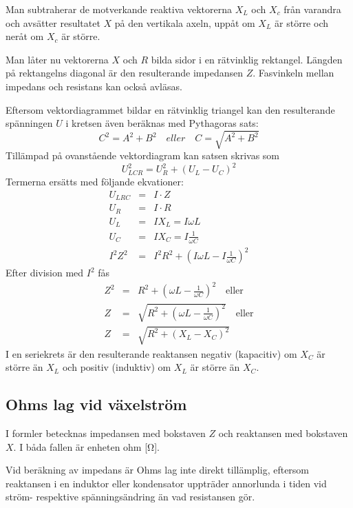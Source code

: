 Man subtraherar de motverkande reaktiva vektorerna \(X_L\) och \(X_c\) från
varandra och avsätter resultatet \(X\) på den vertikala axeln, uppåt om \(X_L\)
är större och neråt om \(X_c\) är större.

Man låter nu vektorerna \(X\) och \(R\) bilda sidor i en rätvinklig rektangel.
Längden på rektangelns diagonal är den resulterande impedansen \(Z\).
Fasvinkeln mellan impedans och resistans kan också avläsas.

Eftersom vektordiagrammet bildar en rätvinklig triangel kan den resulterande
spänningen \(U\) i kretsen även beräknas med Pythagoras sats:
%
\[C^2 = A^2 + B^2 \quad eller \quad C = \sqrt{A^2 + B^2}\]
%
Tillämpad på ovanstående vektordiagram kan satsen skrivas som
%
\[U_{LCR}^2 = U_R^2 + ( U_L - U_C)^2\]
%
Termerna ersätts med följande ekvationer:
\[
\begin{array}{rcl}
  U_{LRC} &=& I \cdot Z \\[1ex]
  U_R     &=& I \cdot R \\[1ex]
  U_L     &=& I X_L = I \omega L \\[1ex]
  U_C     &=& I X_C = I \frac{1}{\omega C} \\[1ex]
  I^2 Z^2 &=& I^2 R^2 + ( I \omega L - I\frac{1}{\omega C})^2
\end{array}
\]
%
Efter division med \(I^2\) fås
%
\[
\begin{array}{rcl}
  Z^2 &=& R^2 + ( \omega L - \frac{1}{\omega C} )^2 \quad \text{eller} \\[1ex]
  Z   &=& \sqrt{R^2 + (\omega L - \frac{1}{\omega C})^2} \quad \text{eller} \\[1ex]
  Z   &=& \sqrt{R^2 + (X_L - X_C)^2}
\end{array}
\]
I en seriekrets är den resulterande reaktansen negativ (kapacitiv) om \(X_C\) är
större än \(X_L\) och positiv (induktiv) om \(X_L\) är större än \(X_C\).

\subsection{Ohms lag vid växelström}
\label{ohms_lag_växelström}

I formler betecknas impedansen med bokstaven \(Z\) och reaktansen med bokstaven
\(X\).
I båda fallen är enheten ohm [\si{\ohm}].

Vid beräkning av impedans är Ohms lag inte direkt tillämplig, eftersom
reaktansen i en induktor eller kondensator uppträder annorlunda i tiden vid
ström- respektive spänningsändring än vad resistansen gör.

